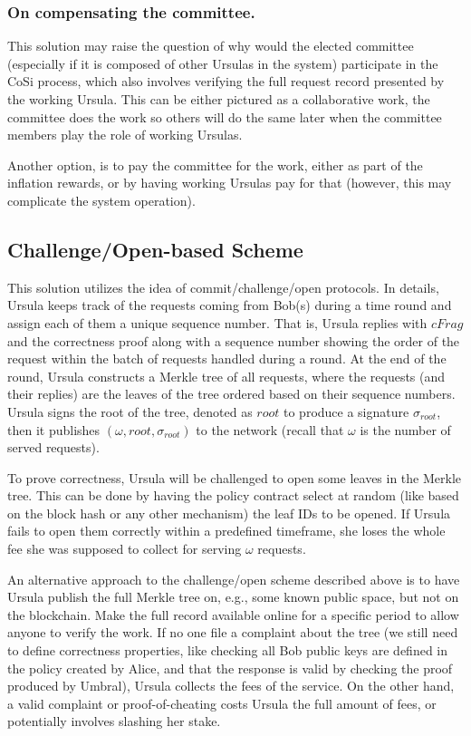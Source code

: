 \subsubsection{On compensating the committee.} This solution may 
raise the question of why would the elected committee (especially if it 
is composed of other Ursulas in the system) participate in the CoSi 
process, which also involves verifying the full request record presented 
by the working Ursula. This can be either pictured as a collaborative 
work, the committee does the work so others will do the same later 
when the committee members play the role of working Ursulas.


Another option, is to pay the committee for the work, either as 
part of the inflation rewards, or by having working Ursulas pay for 
that (however, this may complicate the system operation).


\subsection{Challenge/Open-based Scheme}
This solution utilizes the idea of commit/challenge/open protocols. 
In details, Ursula keeps track of the requests coming from Bob(s) 
during a time round and assign each of them a unique sequence 
number. That is, Ursula replies with $cFrag$ and the correctness proof 
along with a sequence number showing the order of the request within 
the batch of requests handled during a round. At the end of the round, 
Ursula constructs a Merkle tree of all requests, where 
the requests (and their replies) are the leaves of the tree ordered based on their sequence 
numbers. Ursula signs the root of the tree, denoted as $root$ to produce 
a signature $\sigma_{root}$, then it publishes $(\omega, root, \sigma_{root})$ 
to the network (recall that $\omega$ is the number of served requests). 


To prove correctness, Ursula will be challenged to open some leaves in the Merkle tree. 
This can be done by having the policy contract select at random (like based 
on the block hash or any other mechanism) the leaf IDs to be opened. If 
Ursula fails to open them correctly within a predefined timeframe, she loses the 
whole fee she was supposed to collect for serving $\omega$ requests.


An alternative approach to the challenge/open scheme described above is to 
have Ursula publish the full Merkle tree on, e.g., some known public space, but 
not on the blockchain. Make the full record available online for a specific period 
to allow anyone to verify the work. If no one file a complaint about the tree (we 
still need to define correctness properties, like checking all Bob public keys are 
defined in the policy created by Alice, and that the response is valid by checking the 
proof produced by Umbral), Ursula collects the fees of the service. On the other 
hand, a valid complaint or proof-of-cheating costs Ursula the full amount of fees, or potentially involves slashing her stake. 